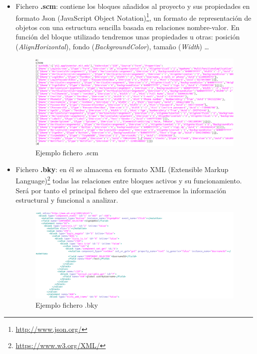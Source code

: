 \documentclass[a4paper, 12pt]{book}
\begin{document}
\begin{itemize}
  \item Fichero \textbf{.scm}: contiene los bloques añadidos al proyecto y sus propiedades en formato Json (JavaScript Object Notation)\footnote{\url{http://www.json.org/}}, un formato de representación de objetos con una estructura sencilla basada en relaciones nombre-valor. En función del bloque utilizado tendremos unas propiedades u otras: posición (\textit{AlignHorizontal}), fondo (\textit{BackgroundColor}), tamaño (\textit{Width}) \ldots 
	\begin{figure}[H]
	  \centering
	  \includegraphics[width=\linewidth, keepaspectratio]{img/scmCode}
	  \caption{Ejemplo fichero .scm}
	  \label{fig:scmfile}
	\end{figure}
  \item Fichero \textbf{.bky}: en él se almacena en formato XML (Extensible Markup Language)\footnote{\url{https://www.w3.org/XML/}} todas las relaciones entre bloques activos y su funcionamiento. Será por tanto el principal fichero del que extraeremos la información estructural y funcional a analizar.
	\begin{figure}[H]
	  \centering
	  \includegraphics[width=\linewidth, keepaspectratio]{img/bkyCode}
	  \caption{Ejemplo fichero .bky}
	  \label{fig:bkyfile}
	\end{figure}
\end{itemize}
\end{document}
